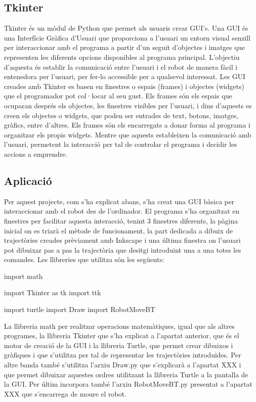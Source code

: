 \subsection{Tkinter}
Tkinter és un mòdul de Python que permet als usuaris crear GUI’s. Una GUI és una Interfície Gràfica d’Usuari que proporciona a l’usuari un entorn visual senzill per interaccionar amb el programa a partir d’un seguit d’objectes i imatges que representen les diferents opcions disponibles al programa principal. L’objectiu d’aquesta és establir la comunicació entre l’usuari i el robot de manera fàcil i entenedora per l’usuari, per fer-lo accessible per a qualsevol interessat. 
Les GUI creades amb Tkinter es basen en finestres o espais (frames) i objectes (widgets) que el programador pot col·locar al seu gust. Els frames són els espais que ocuparan després els objectes, les finestres visibles per l’usuari, i dins d’aquests es creen els objectes o widgets, que poden ser entrades de text, botons, imatges, gràfics, entre d’altres. Els frames són els encarregats a donar forma al programa i organitzar els propis widgets. Mentre que aquests estableixen la comunicació amb l’usuari, permetent la interacció per tal de controlar el programa i decidir les accions a emprendre. 

\subsection{Aplicació}
Per aquest projecte, com s’ha explicat abans, s’ha creat una GUI bàsica per interaccionar amb el robot des de l’ordinador. El programa s’ha organitzat en finestres per facilitar aquesta interacció, tenint 3 finestres diferents, la pàgina inicial on es triarà el mètode de funcionament, la part dedicada a dibuix de trajectòries creades prèviament amb Inkscape i una última finestra on l’usuari pot dibuixar pas a pas la trajectòria que desitgi introduint una a una totes les comandes.
Les llibreries que utilitza són les següents:

\begin{python}
	import math
	
	import Tkinter as tk
	import ttk
	
	import turtle
	import Draw
	import RobotMoveBT
\end{python}

La llibreria math per realitzar operacions matemàtiques, igual que als altres programes, la llibreria Tkinter que s’ha explicat a l’apartat anterior, que és el motor de creació de la GUI i la llibreria Turtle, que permet crear dibuixos i gràfiques i que s’utilitza per tal de representar les trajectòries introduïdes. Per altre banda també s’utilitza l’arxiu Draw.py que s’explicarà a l’apartat XXX i que permet dibuixar aquestes ordres utilitzant la llibreria Turtle a la pantalla de la GUI.  Per últim incorpora també l’arxiu RobotMoveBT.py presentat a l’apartat XXX que s’encarrega de moure el robot. 

